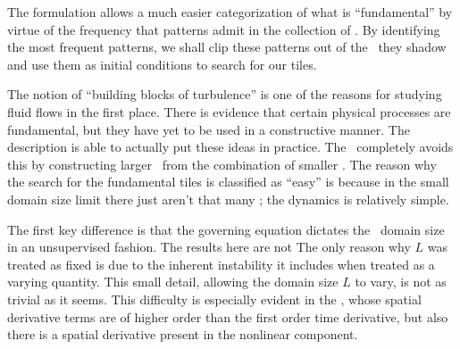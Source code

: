 The {\spt} formulation allows a much easier categorization of what is
``fundamental'' by virtue of the frequency that patterns admit in the
collection of \twots. By identifying the most frequent patterns, we shall
clip these patterns out of the \twots\ they shadow and use them as initial
conditions to search for our tiles.


The notion of ``building blocks of turbulence'' is one of the reasons for
studying fluid flows in the first place. There is evidence that certain
physical processes are fundamental, but they have yet to be used in a
constructive manner. The {\spt} description is able to actually put
these ideas in practice.
The \spt\ completely avoids this by constructing larger \twots\
from the combination of smaller \twots.
The reason
why the search for the fundamental tiles is classified as ``easy'' is because
in the small domain size limit there just aren't that many \twots; the dynamics
is relatively simple.

The first key difference is that the governing equation
dictates the \spt\ domain size in an unsupervised
fashion. The results here are not
The only reason why $L$ was treated as fixed is due to the
inherent instability it includes when treated as a varying quantity.
This small detail, allowing the domain size $L$ to vary,
is not as trivial as it seems.
 This difficulty
is especially evident in the \KSe, whose spatial derivative terms
are of higher order than the first order time derivative, but also
there is a spatial derivative present in the nonlinear component.




